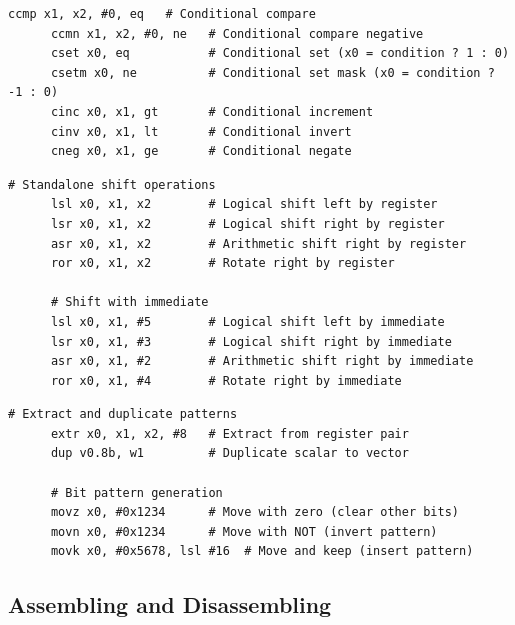   \begin{definition}
    \label{def:conditional-logic}
    \begin{lstlisting}[language=arm]
      ccmp x1, x2, #0, eq   # Conditional compare
      ccmn x1, x2, #0, ne   # Conditional compare negative
      cset x0, eq           # Conditional set (x0 = condition ? 1 : 0)
      csetm x0, ne          # Conditional set mask (x0 = condition ? -1 : 0)
      cinc x0, x1, gt       # Conditional increment
      cinv x0, x1, lt       # Conditional invert
      cneg x0, x1, ge       # Conditional negate
    \end{lstlisting}
  \end{definition}

  \begin{definition}
    \label{def:logical-shift-operations}
    \begin{lstlisting}[language=arm]
      # Standalone shift operations
      lsl x0, x1, x2        # Logical shift left by register
      lsr x0, x1, x2        # Logical shift right by register
      asr x0, x1, x2        # Arithmetic shift right by register
      ror x0, x1, x2        # Rotate right by register
      
      # Shift with immediate
      lsl x0, x1, #5        # Logical shift left by immediate
      lsr x0, x1, #3        # Logical shift right by immediate
      asr x0, x1, #2        # Arithmetic shift right by immediate
      ror x0, x1, #4        # Rotate right by immediate
    \end{lstlisting}
  \end{definition}

  \begin{definition}
    \label{def:pattern-operations}
    \begin{lstlisting}[language=arm]
      # Extract and duplicate patterns
      extr x0, x1, x2, #8   # Extract from register pair
      dup v0.8b, w1         # Duplicate scalar to vector
      
      # Bit pattern generation
      movz x0, #0x1234      # Move with zero (clear other bits)
      movn x0, #0x1234      # Move with NOT (invert pattern)
      movk x0, #0x5678, lsl #16  # Move and keep (insert pattern)
    \end{lstlisting}
  \end{definition}

\subsection{Assembling and Disassembling} 

